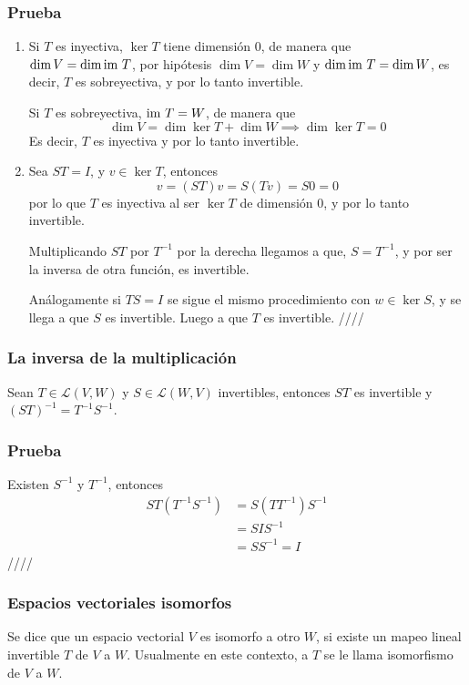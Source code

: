 \documentclass{article}
\begin{document}
\subsubsection*{Prueba}
\begin{enumerate}
    \item Si $T$ es inyectiva, $\ker T$ tiene dimensión $0$, de manera 
    que\\
    $\dim V = \dim \text{im } T$, por hipótesis $\dim V = \dim W$ y
    $\dim \text{im } T = \dim W$, es decir, $T$ es sobreyectiva, y por lo tanto
    invertible.
    
    Si $T$ es sobreyectiva, $\text{im } T = W$, de manera que
    $$\dim V = \dim \ker T + \dim W \implies \dim \ker T = 0$$
    Es decir, $T$ es inyectiva y por lo tanto invertible.

    \item Sea $ST=I$, y $v\in\ker T$, entonces
    $$v = (ST)v = S(Tv) = S0 = 0$$
    por lo que $T$ es inyectiva al ser $\ker T$ de dimensión $0$,
    y por lo tanto invertible.

    Multiplicando $ST$ por $T^{-1}$ por la derecha llegamos a que,
    $S=T^{-1}$, y por ser la inversa de otra función, es invertible. 

    Análogamente si $TS=I$ se sigue el mismo procedimiento con
    $w\in\ker S$, y se llega a que $S$ es invertible. Luego a que $T$ 
    es invertible. \hfill ////
\end{enumerate}

\subsubsection{La inversa de la multiplicación}
Sean $T\in\mathcal{L}(V,W)$ y $S\in\mathcal{L}(W,V)$ invertibles, 
entonces $ST$ es invertible y $(ST)^{-1}=T^{-1}S^{-1}$.
\subsubsection*{Prueba}
Existen $S^{-1}$ y $T^{-1}$, entonces
\begin{align*}
    ST(T^{-1}S^{-1}) &= S(TT^{-1})S^{-1}\\
    &= SIS^{-1}\\
    &= SS^{-1} = I
\end{align*}
\hfill ////

\subsubsection{Espacios vectoriales isomorfos}
Se dice que un espacio vectorial $V$ es isomorfo a otro $W$,
si existe un mapeo lineal invertible $T$ de $V$ a $W$. Usualmente en 
este contexto, a $T$ se le llama isomorfismo de $V$ a $W$.
\end{document}
